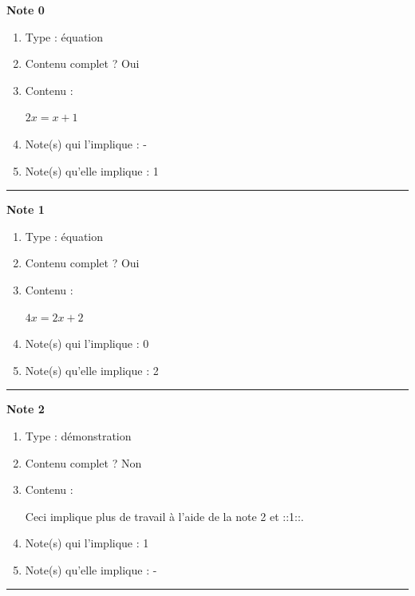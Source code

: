 \documentclass[12pt,a4paper]{article}
\begin{document}
\noindent\textbf{ Note 0}
\begin{enumerate}[label=$-$]
\item Type : équation
\item Contenu complet ? Oui
\item Contenu :\\
\hspace*{.5cm}\begin{minipage}{20cm}
     $2x=x+1$ 
\end{minipage}
\item Note(s) qui l'implique : -
\item Note(s) qu'elle implique : 1
\end{enumerate}
\vspace{.2cm}
\hrule

\noindent\textbf{ Note 1}
\begin{enumerate}[label=$-$]
\item Type : équation
\item Contenu complet ? Oui
\item Contenu :\\
\hspace*{.5cm}\begin{minipage}{20cm}
     $4x=2x+2$ 
\end{minipage}
\item Note(s) qui l'implique : 0
\item Note(s) qu'elle implique : 2
\end{enumerate}
\vspace{.2cm}
\hrule

\noindent\textbf{ Note 2}
\begin{enumerate}[label=$-$]
\item Type : démonstration
\item Contenu complet ? Non
\item Contenu :\\
\hspace*{.5cm}\begin{minipage}{20cm}
     Ceci implique plus de travail à l'aide de la note 2 et ::1::.
\end{minipage}
\item Note(s) qui l'implique : 1
\item Note(s) qu'elle implique : -
\end{enumerate}
\vspace{.2cm}
\hrule
\end{document}
